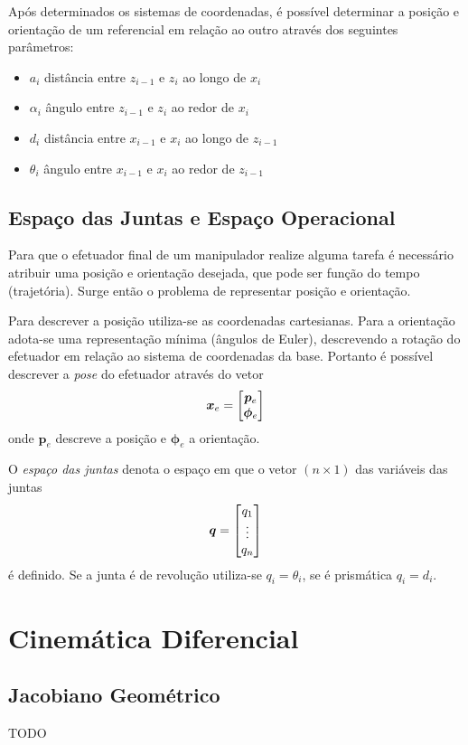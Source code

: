 Após determinados os sistemas de coordenadas, é possível determinar a posição e orientação de um referencial em relação ao outro através dos seguintes parâmetros:
\begin{itemize}
\item $a_i$ distância entre $z_{i-1}$ e $z_i$ ao longo de $x_i$
\item $\alpha_i$ ângulo entre $z_{i-1}$ e $z_i$ ao redor de $x_i$
\item $d_i$ distância entre $x_{i-1}$ e $x_i$ ao longo de $z_{i-1}$
\item $\theta_i$ ângulo entre $x_{i-1}$ e $x_i$ ao redor de $z_{i-1}$
\end{itemize}
\subsection{Espaço das Juntas e Espaço Operacional}
Para que o efetuador final de um manipulador realize alguma tarefa é necessário atribuir uma posição e orientação desejada, que  pode ser função do tempo (trajetória). Surge então o problema de representar posição e orientação. 

Para descrever a posição utiliza-se as coordenadas cartesianas. Para a orientação adota-se uma representação mínima (ângulos de Euler), descrevendo a rotação do efetuador em relação ao sistema de coordenadas da base. Portanto é possível descrever a \textit{pose} do efetuador através do vetor
\begin{equation} \label{eq:op_space}
\bm{x}_e = \begin{bmatrix} \bm{p}_e \\ \bm{\phi}_e\end{bmatrix}
\end{equation}
onde $\bm{p}_e$ descreve a posição e $\bm{\phi}_e$ a orientação.

O \textit{espaço das juntas} denota o espaço em que o vetor $(n \times 1)$ das variáveis das juntas
\begin{equation} \label{eq:joint_space}
\bm{q} = \begin{bmatrix}q_1 \\ \vdots \\ q_n\end{bmatrix}
\end{equation} 
é definido. Se a junta é de revolução utiliza-se $q_i = \theta_i$, se é prismática $q_i = d_i$.

\section{Cinemática Diferencial}
\subsection{Jacobiano Geométrico}
TODO
